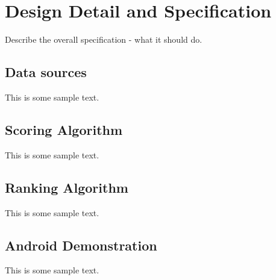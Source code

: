 \chapter{Design Detail and Specification}

Describe the overall specification - what it should do.

\section{Data sources}

This is some sample text.

\section{Scoring Algorithm}

This is some sample text.

\section{Ranking Algorithm}

This is some sample text.

\section{Android Demonstration}

This is some sample text.
